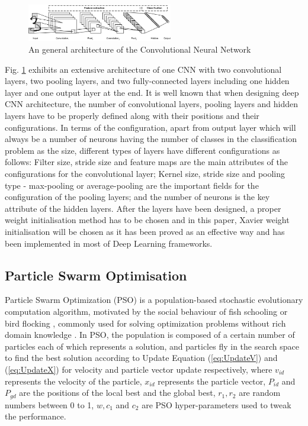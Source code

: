 \documentclass[conference]{IEEEtran}
\begin{document}
\begin{figure}[!t]
	\centering
	\includegraphics[width=2.5in]{cnn_architecture}
	\caption{An general architecture of the Convolutional Neural Network}
	\label{fig:CNNArchitecture}
\end{figure}

Fig. \ref{fig:CNNArchitecture} exhibits an extensive architecture of one CNN with two convolutional layers, two pooling layers, and two fully-connected layers including one hidden layer and one output layer at the end. It is well known that when designing deep CNN architecture, the number of convolutional layers, pooling layers and hidden layers have to be properly defined along with their positions and their configurations. In terms of the configuration, apart from output layer which will always be a number of neurons having the number of classes in the classification problem as the size, different types of layers have different configurations as follows: Filter size, stride size and feature maps are the main attributes of the configurations for the convolutional layer; Kernel size, stride size and pooling type - max-pooling or average-pooling are the important fields for the configuration of the pooling layers; and the number of neurons is the key attribute of the hidden layers. After the layers have been designed, a proper weight initialisation method has to be chosen and in this paper, Xavier weight initialisation \cite{WeightIniti:Glorot} will be chosen as it has been proved as an effective way and has been implemented in most of Deep Learning frameworks.

\subsection{Particle Swarm Optimisation}

Particle Swarm Optimization (PSO) is a population-based stochastic evolutionary computation algorithm, motivated by the social behaviour of fish schooling or bird flocking \cite{PSOIntro:Kennedy} \cite{PSOIntro:Eberhart}, commonly used for solving optimization problems without rich domain knowledge \cite{PSOIntro:Yanan}. In PSO, the population is composed of a certain number of particles each of which represents a solution, and particles fly in the search space to find the best solution according to Update Equation (\ref{eq:UpdateV}) and (\ref{eq:UpdateX}) for velocity and particle vector update respectively, where $v_{id}$ represents the velocity of the particle, $x_{id}$ represents the particle vector, $P_{id}$ and $P_{gd}$ are the positions of the local best and the global best, $r_{1}, r_{2}$ are random numbers between 0 to 1, $w, c_{1}$ and $c_{2}$ are PSO hyper-parameters used to tweak the performance. 
\end{document}
